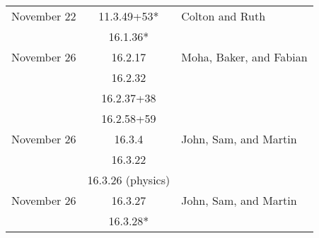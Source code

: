 \documentclass[12pt]{amsart}
\begin{document}
\begin{longtable}{c|c|l}
        November 22     & 11.3.49+53*                          & Colton and Ruth                          \\
                        & 16.1.36*                             &                                          \\
        November 26     & 16.2.17                              & Moha, Baker, and Fabian                  \\
                        & 16.2.32                              &                                          \\
                        & 16.2.37+38                           &                                          \\
                        & 16.2.58+59                           &                                          \\
        November 26     & 16.3.4                               & John, Sam, and Martin                    \\
                        & 16.3.22                              &                                          \\
                        & 16.3.26 (physics)                    &                                          \\
        November 26     & 16.3.27                              & John, Sam, and Martin                    \\
                        & 16.3.28*                             &                                          
    \end{longtable}
\end{document}
